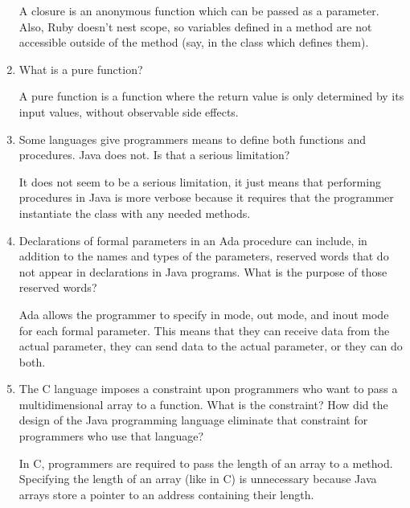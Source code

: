 \begin{enumerate}
 \begin{answer}
     A closure is an anonymous function which can be passed as a
     parameter. Also, Ruby doesn't nest scope, so variables defined in
     a method are not accessible outside of the method (say, in the
     class which defines them).
     \end{answer}
   

  \item What is a pure function?

\begin{answer}
    A pure function is a function where the return value is only
    determined by its input values, without observable side effects.
\end{answer}

  \item Some languages give programmers means to define
    both functions and procedures. Java does not. Is that
    a serious limitation?

\begin{answer}
    It does not seem to be a serious limitation, it just means that
    performing procedures in Java is more verbose because it requires
    that the programmer instantiate the class with any needed methods.
    \end{answer}

  \item Declarations of formal parameters in an Ada procedure
    can include, in addition to the names and types of the
    parameters, reserved words that do not appear in declarations
    in Java programs. 
    What is the purpose of those reserved words?
 
 \begin{answer}
    Ada allows the programmer to specify in mode, out mode, and inout
    mode for each formal parameter.  This means that they can receive
    data from the actual parameter, they can send data to the actual
    parameter, or they can do both.
    \end{answer}

  \item The C language imposes a constraint upon programmers
    who want to pass a multidimensional array to a function.
    What is the constraint? How did the design of the Java
    programming language eliminate that constraint for 
    programmers who use that language?


\begin{answer}
   In C, programmers are required to pass the length of an array to a
   method. Specifying the length of an array (like in C) is
   unnecessary because Java arrays store a pointer to an address
   containing their length.
    \end{answer}


\end{enumerate}
